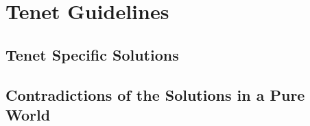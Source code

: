 \section{\ms{} Tenet Guidelines}

\subsection{\ms{} Tenet Specific Solutions}

\subsection{Contradictions of the Solutions in a Pure \ms{} World}
